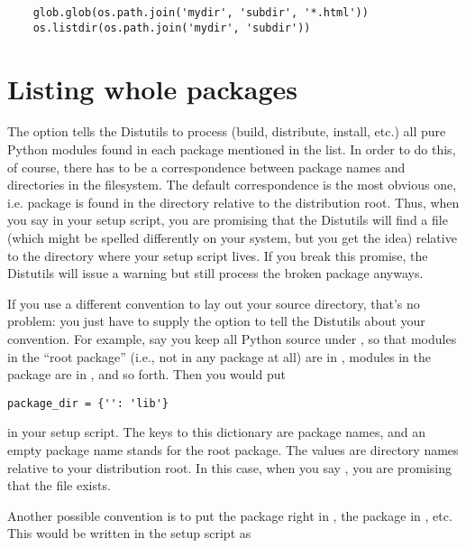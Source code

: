 \documentclass{manual}
\begin{document}
\begin{verbatim}
    glob.glob(os.path.join('mydir', 'subdir', '*.html'))
    os.listdir(os.path.join('mydir', 'subdir'))
\end{verbatim}


\section{Listing whole packages}
\label{listing-packages}

The  option tells the Distutils to process (build,
distribute, install, etc.) all pure Python modules found in each package
mentioned in the  list.  In order to do this, of
course, there has to be a correspondence between package names and
directories in the filesystem.  The default correspondence is the most
obvious one, i.e. package  is found in the directory
 relative to the distribution root.  Thus, when you say
 in your setup script, you are promising that
the Distutils will find a file  (which might
be spelled differently on your system, but you get the idea) relative to
the directory where your setup script lives.  If you break this
promise, the Distutils will issue a warning but still process the broken
package anyways.

If you use a different convention to lay out your source directory,
that's no problem: you just have to supply the 
option to tell the Distutils about your convention.  For example, say
you keep all Python source under , so that modules in the
``root package'' (i.e., not in any package at all) are in
, modules in the  package are in ,
and so forth.  Then you would put

\begin{verbatim}
package_dir = {'': 'lib'}
\end{verbatim}

in your setup script.  The keys to this dictionary are package names,
and an empty package name stands for the root package.  The values are
directory names relative to your distribution root.  In this case, when
you say , you are promising that the file
 exists.

Another possible convention is to put the  package right in 
, the  package in , etc.  This
would be written in the setup script as
\end{document}
